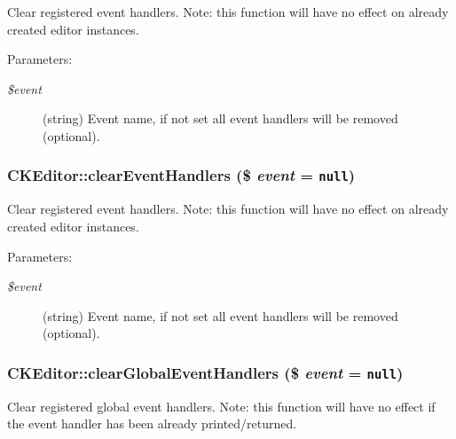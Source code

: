 Clear registered event handlers. Note: this function will have no effect on already created editor instances.

\begin{Desc}
\item[Parameters:]
\begin{description}
\item[{\em \$event}](string) Event name, if not set all event handlers will be removed (optional). \end{description}
\end{Desc}
\hypertarget{classCKEditor_1b92304a2eef124810dd2be4f30e18f9}{
\subsubsection[{clearEventHandlers}]{\setlength{\rightskip}{0pt plus 5cm}CKEditor::clearEventHandlers (\$ {\em event} = {\tt null})}}
\label{classCKEditor_1b92304a2eef124810dd2be4f30e18f9}


Clear registered event handlers. Note: this function will have no effect on already created editor instances.

\begin{Desc}
\item[Parameters:]
\begin{description}
\item[{\em \$event}](string) Event name, if not set all event handlers will be removed (optional). \end{description}
\end{Desc}
\hypertarget{classCKEditor_8eff2f69ca071cf793b719ef4ddea97e}{
\subsubsection[{clearGlobalEventHandlers}]{\setlength{\rightskip}{0pt plus 5cm}CKEditor::clearGlobalEventHandlers (\$ {\em event} = {\tt null})}}
\label{classCKEditor_8eff2f69ca071cf793b719ef4ddea97e}


Clear registered global event handlers. Note: this function will have no effect if the event handler has been already printed/returned.

